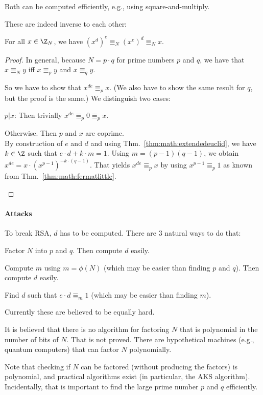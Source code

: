 Both can be computed efficiently, e.g., using square-and-multiply.

These are indeed inverse to each other:

\begin{theorem}
For all $x\in \Z_N$, we have $(x^d)^e\Equiv_N (x^e)^d \Equiv_N x$.
\end{theorem}
\begin{proof}
In general, because $N=p\cdot q$ for prime numbers $p$ and $q$, we have that $x\Equiv_N y$ iff $x\Equiv_p y$ and $x\Equiv_q y$.

So we have to show that $x^{de}\Equiv_p x$.
(We also have to show the same result for $q$, but the proof is the same.)
We distinguish two cases:
\begin{compactitem}
\item $p|x$: Then trivially $x^{de}\Equiv_p 0\Equiv_p x$.
\item Otherwise. Then $p$ and $x$ are coprime.\\
   By construction of $e$ and $d$ and using Thm.~\ref{thm:math:extendedeuclid}, we have $k\in\Z$ such that $e\cdot d+k\cdot m=1$.
   Using $m=(p-1)(q-1)$, we obtain $x^{de}=x\cdot (x^{p-1})^{-k\cdot(q-1)}$.
   That yields $x^{de}\Equiv_p x$ by using $x^{p-1}\Equiv_p 1$ as known from Thm.~\ref{thm:math:fermatlittle}.
\end{compactitem}
\end{proof}

\paragraph{Attacks}
To break RSA, $d$ has to be computed.
There are $3$ natural ways to do that:
\begin{compactitem}
 \item Factor $N$ into $p$ and $q$. Then compute $d$ easily.
 \item Compute $m$ using $m=\phi(N)$ (which may be easier than finding $p$ and $q$). Then compute $d$ easily.
 \item Find $d$ such that $e\cdot d\Equiv_m 1$ (which may be easier than finding $m$).
\end{compactitem}
Currently these are believed to be equally hard.

It is believed that there is no algorithm for factoring $N$ that is polynomial in the number of bits of $N$.
That is not proved.
There are hypothetical machines (e.g., quantum computers) that can factor $N$ polynomially.

Note that checking if $N$ can be factored (without producing the factors) is polynomial, and practical algorithms exist (in particular, the AKS algorithm).
Incidentally, that is important to find the large prime number $p$ and $q$ efficiently.
\medskip

